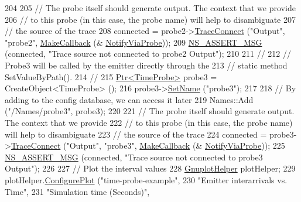 \begin{DoxyCode}
204 
205   \textcolor{comment}{// The probe itself should generate output.  The context that we provide}
206   \textcolor{comment}{// to this probe (in this case, the probe name) will help to disambiguate}
207   \textcolor{comment}{// the source of the trace}
208   connected = probe2->\hyperlink{classns3_1_1ObjectBase_ada3a45b34bc23114a25e0ab19188276e}{TraceConnect} (\textcolor{stringliteral}{"Output"}, \textcolor{stringliteral}{"probe2"}, \hyperlink{group__makecallbackmemptr_ga9376283685aa99d204048d6a4b7610a4}{MakeCallback} (&
      \hyperlink{time-probe-example_8cc_a2b89eb6cf8dc830f27ce00766bf62c68}{NotifyViaProbe}));
209   \hyperlink{assert_8h_aff5ece9066c74e681e74999856f08539}{NS\_ASSERT\_MSG} (connected, \textcolor{stringliteral}{"Trace source not connected to probe2 Output"});
210 
211   \textcolor{comment}{//}
212   \textcolor{comment}{// Probe3 will be called by the emitter directly through the}
213   \textcolor{comment}{// static method SetValueByPath().}
214   \textcolor{comment}{//}
215   \hyperlink{classns3_1_1Ptr}{Ptr<TimeProbe>} probe3 = CreateObject<TimeProbe> ();
216   probe3->\hyperlink{classns3_1_1DataCollectionObject_a9bf5a3af1190f7efadb1baae36889eaa}{SetName} (\textcolor{stringliteral}{"probe3"});
217 
218   \textcolor{comment}{// By adding to the config database, we can access it later}
219   Names::Add (\textcolor{stringliteral}{"/Names/probe3"}, probe3);
220 
221   \textcolor{comment}{// The probe itself should generate output.  The context that we provide}
222   \textcolor{comment}{// to this probe (in this case, the probe name) will help to disambiguate}
223   \textcolor{comment}{// the source of the trace}
224   connected = probe3->\hyperlink{classns3_1_1ObjectBase_ada3a45b34bc23114a25e0ab19188276e}{TraceConnect} (\textcolor{stringliteral}{"Output"}, \textcolor{stringliteral}{"probe3"}, \hyperlink{group__makecallbackmemptr_ga9376283685aa99d204048d6a4b7610a4}{MakeCallback} (&
      \hyperlink{time-probe-example_8cc_a2b89eb6cf8dc830f27ce00766bf62c68}{NotifyViaProbe}));
225   \hyperlink{assert_8h_aff5ece9066c74e681e74999856f08539}{NS\_ASSERT\_MSG} (connected, \textcolor{stringliteral}{"Trace source not connected to probe3 Output"});
226 
227   \textcolor{comment}{// Plot the interval values}
228   \hyperlink{classns3_1_1GnuplotHelper}{GnuplotHelper} plotHelper;
229   plotHelper.\hyperlink{classns3_1_1GnuplotHelper_a05a9beecc9f5ece76cda792daeea6fc3}{ConfigurePlot} (\textcolor{stringliteral}{"time-probe-example"},
230                             \textcolor{stringliteral}{"Emitter interarrivals vs. Time"},
231                             \textcolor{stringliteral}{"Simulation time (Seconds)"},

\end{DoxyCode}
